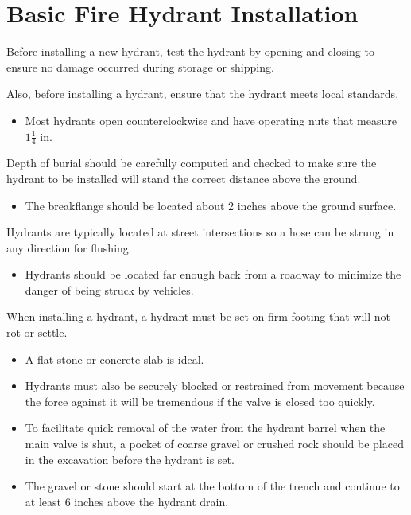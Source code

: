 \documentclass[10pt]{article}
\begin{document}
\section{Basic Fire Hydrant Installation}
Before installing a new hydrant, test the hydrant by opening and closing to ensure no damage occurred during storage or shipping.

Also, before installing a hydrant, ensure that the hydrant meets local standards.

\begin{itemize}
  \item Most hydrants open counterclockwise and have operating nuts that measure $1 \frac{1}{4}$ in.
\end{itemize}
Depth of burial should be carefully computed and checked to make sure the hydrant to be installed will stand the correct distance above the ground.

\begin{itemize}
  \item The breakflange should be located about 2 inches above the ground surface.
\end{itemize}
Hydrants are typically located at street intersections so a hose can be strung in any direction for flushing.

\begin{itemize}
  \item Hydrants should be located far enough back from a roadway to minimize the danger of being struck by vehicles.
\end{itemize}
When installing a hydrant, a hydrant must be set on firm footing that will not rot or settle.

\begin{itemize}
  \item A flat stone or concrete slab is ideal.

  \item Hydrants must also be securely blocked or restrained from movement because the force against it will be tremendous if the valve is closed too quickly.

  \item To facilitate quick removal of the water from the hydrant barrel when the main valve is shut, a pocket of coarse gravel or crushed rock should be placed in the excavation before the hydrant is set.

  \item The gravel or stone should start at the bottom of the trench and continue to at least 6 inches above the hydrant drain.

\end{itemize}
\end{document}
